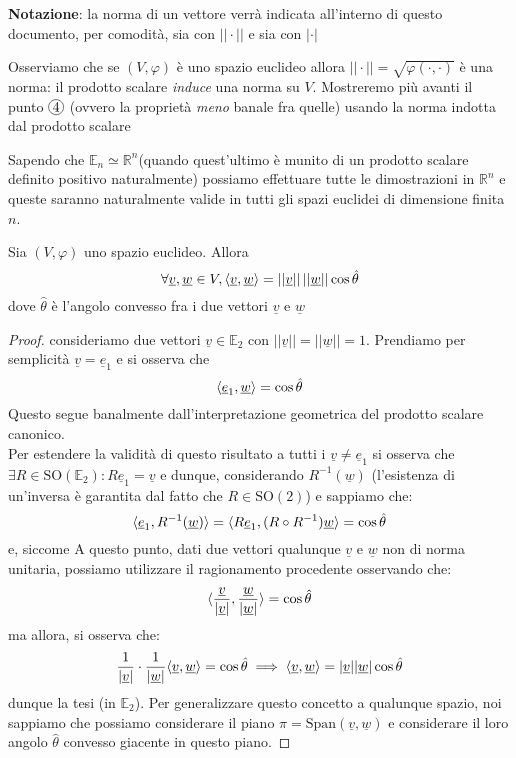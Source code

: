 \documentclass[openany]{book}
\begin{document}
\noindent \textbf{Notazione}: la norma di un vettore verrà indicata all'interno di questo documento, per comodità, sia con $||\cdot||$ e sia con $|\cdot|$
\begin{remark}
Osserviamo che se $(V, \varphi)$ è uno spazio euclideo allora $|| \cdot || = \sqrt{\varphi(\cdot, \cdot)}$ è una norma: il prodotto scalare \emph{induce} una norma su $V$. Mostreremo più avanti il punto $\circled{4}$ (ovvero la proprietà \emph{meno} banale fra quelle) usando la norma indotta dal prodotto scalare
\end{remark}
\noindent Sapendo che $\mathbb{E}_n \simeq \mathbb{R}^n$(quando quest'ultimo è munito di un prodotto scalare definito positivo naturalmente) possiamo effettuare tutte le dimostrazioni in $\mathbb{R}^n$ e queste saranno naturalmente valide in tutti gli spazi euclidei di dimensione finita $n$. 
\begin{theorem} Sia $(V, \varphi)$ uno spazio euclideo. Allora $$\forall \underline{v}, \underline{w} \in V, \langle \underline{v}, \underline{w} \rangle = ||\underline{v}|| \, || \underline{w} || \cos{\hat{\theta}}$$
dove $\hat{\theta}$ è l'angolo convesso fra i due vettori $\underline{v}$ e $\underline{w}$
\end{theorem}
\begin{proof}
consideriamo due vettori $\underline{v} \in \mathbb{E}_2$ con $|| \underline{v} || = || \underline{w} || = 1$. Prendiamo per semplicità $\underline{v} = \underline{e}_1$ e si osserva che
$$
\langle \underline{e}_1, \underline{w} \rangle = \cos{\hat{\theta}}
$$
Questo segue banalmente dall'interpretazione geometrica del prodotto scalare canonico. \\
Per estendere la validità di questo risultato a tutti i $\underline{v} \neq \underline{e}_1$ si osserva che $\exists R \in \text{SO}(\mathbb{E}_2): R\underline{e}_1 = \underline{v}$ e dunque, considerando $R^{-1}(\underline{w})$ (l'esistenza di un'inversa è garantita dal fatto che $R \in \text{SO}(2)$) e sappiamo che:
$$
\langle \underline{e}_1, R^{-1}(\underline{w}) \rangle = \langle R \underline{e}_1, (R \circ R^{-1})\underline{w} \rangle = \cos{\hat{\theta}}
$$
e, siccome 
A questo punto, dati due vettori qualunque $\underline{v}$ e $\underline{w}$ non di norma unitaria, possiamo utilizzare il ragionamento procedente osservando che:
$$
\langle \frac{\underline{v}}{|\underline{v}|}, \frac{\underline{w}}{|\underline{w}|} \rangle = \cos{\hat{\theta}}
$$
ma allora, si osserva che:
$$
\frac{1}{|\underline{v}|} \cdot \frac{1}{|\underline{w}|} \langle \underline{v}, \underline{w} \rangle = \cos{\hat{\theta}} \implies \langle \underline{v},  \underline{w} \rangle = |\underline{v}| |\underline{w}| \cos{\hat{\theta}}
$$
dunque la tesi (in $\mathbb{E}_2$). Per generalizzare questo concetto a qualunque spazio, noi sappiamo che possiamo considerare il piano $\pi = \text{Span}(\underline{v}, \underline{w})$ e considerare il loro angolo $\hat{\theta}$ convesso giacente in questo piano.
\end{proof}
\end{document}
